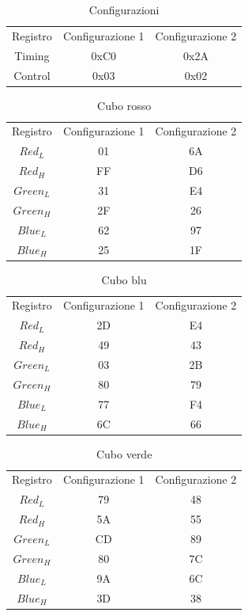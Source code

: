 \documentclass[12pt]{report}
\begin{document}
    \label{subsubsec:Timing}
    \begin{table}[H]
        \centering
        \begin{tabular}{ccc}
            Registro & Configurazione 1 & Configurazione 2\\
             Timing& 0xC0 & 0x2A\\
             Control& 0x03 & 0x02\\
        \end{tabular}
        \caption{Configurazioni}
        \label{tab:configurazioni}
    \end{table}

    \begin{table}[h]
        \centering
        \begin{tabular}{ccc}
            Registro & Configurazione 1 & Configurazione 2\\
             $Red_L$& 01 & 6A\\
             $Red_H$& FF & D6\\
             $Green_L$& 31 & E4\\
             $Green_H$& 2F & 26\\
             $Blue_L$& 62 & 97\\
             $Blue_H$& 25 & 1F\\
        \end{tabular}
        \caption{Cubo rosso}
        \label{tab:cubo_rosso}
    \end{table}

    \begin{table}[h]
        \centering
        \begin{tabular}{ccc}
            Registro & Configurazione 1 & Configurazione 2\\
             $Red_L$& 2D & E4\\
             $Red_H$& 49 & 43\\
             $Green_L$& 03 & 2B\\
             $Green_H$& 80 & 79\\
             $Blue_L$& 77 & F4\\
             $Blue_H$& 6C & 66
        \end{tabular}
        \caption{Cubo blu}
        \label{tab:cubo_blu}
        \end{table}

        \begin{table}[H]
        \centering
        \begin{tabular}{ccc}
            Registro & Configurazione 1 & Configurazione 2\\
             $Red_L$& 79 & 48\\
             $Red_H$& 5A & 55\\
             $Green_L$& CD & 89\\
             $Green_H$& 80 & 7C\\
             $Blue_L$& 9A & 6C\\
             $Blue_H$& 3D & 38
        \end{tabular}
        \caption{Cubo verde}
        \label{tab:cubo_verde}
    \end{table}
\end{document}
